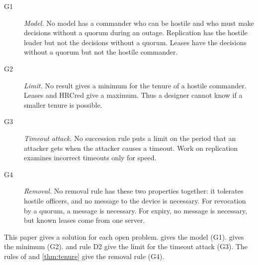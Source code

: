 \begin{description}
  \item[G1] \emph{Model.} No model has a commander who can be hostile and who must make decisions
  without a quorum during an outage. Replication has the hostile leader but not the
  decisions without a quorum. Leases have the decisions without a quorum but not the
  hostile commander.
  \item[G2] \emph{Limit.} No result gives a minimum for the tenure of a hostile commander. Leases
  and HRCred give a maximum. Thus a designer cannot know if a smaller tenure is possible.
  \item[G3] \emph{Timeout attack.} No succession rule puts a limit on the period that an attacker
  gets when the attacker causes a timeout. Work on replication examines incorrect timeouts
  only for speed.
  \item[G4] \emph{Removal.} No removal rule has these two properties together: it tolerates
  hostile officers, and no message to the device is necessary. For revocation by a quorum,
  a message is necessary. For expiry, no message is necessary, but known leases come from
  one server.
\end{description}

This paper gives a solution for each open problem.  gives the model (G1).
 gives the minimum (G2).  and rule D2 give the limit for
the timeout attack (G3). The rules of \sys{} and \cref{thm:tenure} give the removal rule
(G4).
